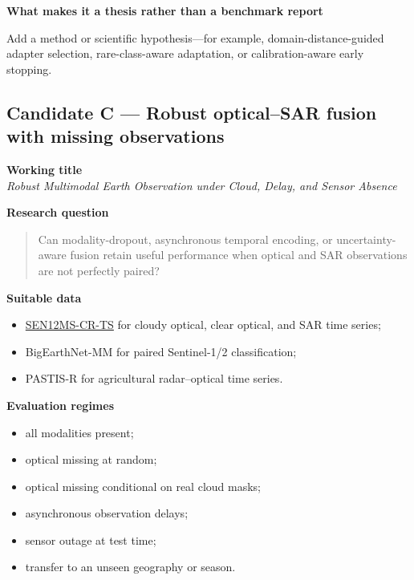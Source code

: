 \documentclass[
  a4paper,
  11pt]{article}
\providecommand{\tightlist}{%
  \setlength{\itemsep}{0pt}\setlength{\parskip}{0pt}}
\begin{document}
\textbf{What makes it a thesis rather than a benchmark report}

Add a method or scientific hypothesis---for example,
domain-distance-guided adapter selection, rare-class-aware adaptation,
or calibration-aware early stopping.

\hypertarget{candidate-c-robust-opticalsar-fusion-with-missing-observations}{%
\subsection{Candidate C --- Robust optical--SAR fusion with missing
observations}\label{candidate-c-robust-opticalsar-fusion-with-missing-observations}}

\textbf{Working title}\\
\emph{Robust Multimodal Earth Observation under Cloud, Delay, and Sensor
Absence}

\textbf{Research question}

\begin{quote}
Can modality-dropout, asynchronous temporal encoding, or
uncertainty-aware fusion retain useful performance when optical and SAR
observations are not perfectly paired?
\end{quote}

\textbf{Suitable data}

\begin{itemize}
\tightlist
\item
  \href{https://arxiv.org/abs/2201.09613}{SEN12MS-CR-TS} for cloudy
  optical, clear optical, and SAR time series;
\item
  BigEarthNet-MM for paired Sentinel-1/2 classification;
\item
  PASTIS-R for agricultural radar--optical time series.
\end{itemize}

\textbf{Evaluation regimes}

\begin{itemize}
\tightlist
\item
  all modalities present;
\item
  optical missing at random;
\item
  optical missing conditional on real cloud masks;
\item
  asynchronous observation delays;
\item
  sensor outage at test time;
\item
  transfer to an unseen geography or season.
\end{itemize}
\end{document}
